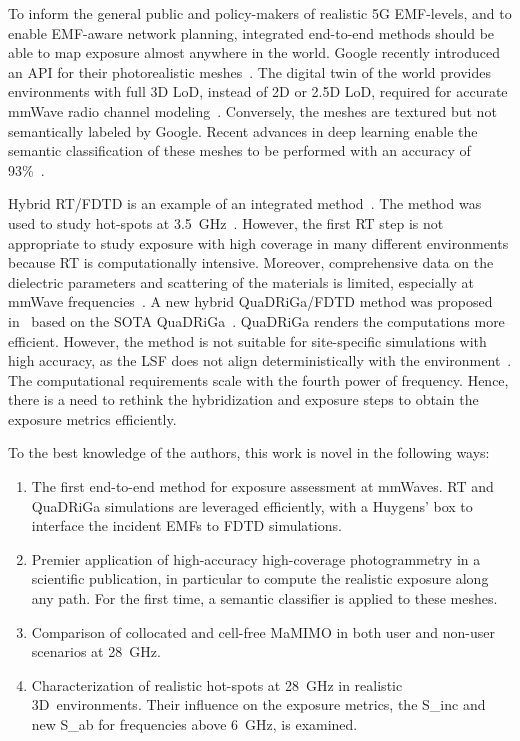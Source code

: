 \documentclass{IEEEtran}
\begin{document}
To inform the general public and policy-makers of realistic \gls{5G} \gls{EMF}-levels, and to enable \gls{EMF}-aware network planning, integrated end-to-end methods should be able to map exposure almost anywhere in the world. 
Google recently introduced an API for their photorealistic meshes~\cite{google}. The digital twin of the world provides environments with full 3D \gls{LoD}, instead of 2D or 2.5D \gls{LoD}, required for accurate \gls{mmWave} radio channel modeling~\cite{He, flatnotenough}. Conversely, the meshes are textured but not semantically labeled by Google. Recent advances in deep learning enable the semantic classification of these meshes to be performed with an accuracy of 93\%~\cite{SUMS}.

Hybrid \gls{RT}/\gls{FDTD} is an example of an integrated method~\cite{RT/FDTD1}. The method was used to study hot-spots at 3.5~GHz~\cite{hotspots_art}. However, the first \gls{RT} step is not appropriate to study exposure with high coverage in many different environments because \gls{RT} is computationally intensive. Moreover, comprehensive data on the dielectric parameters and scattering of the materials is limited, especially at \gls{mmWave} frequencies~\cite{EMparamishard}. A new hybrid \gls{QuaDRiGa}/\gls{FDTD} method was proposed in~\cite{QD/FDTD} based on the \gls{SOTA} \gls{QuaDRiGa}~\cite{Quadriga}. \gls{QuaDRiGa} renders the computations more efficient. However, the method is not suitable for site-specific simulations with high accuracy, as the \gls{LSF} does not align deterministically with the environment~\cite{hotspots_eucap}. The computational requirements scale with the fourth power of frequency. Hence, there is a need to rethink the hybridization and exposure steps to obtain the exposure metrics efficiently.

To the best knowledge of the authors, this work is novel in the following ways:
\begin{enumerate}
    \item The first end-to-end method for exposure assessment at \glspl{mmWave}. \Gls{RT} and \gls{QuaDRiGa} simulations are leveraged efficiently, with a Huygens' box to interface the incident \glspl{EMF} to \gls{FDTD} simulations.
    \item Premier application of high-accuracy high-coverage photogrammetry in a scientific publication, in particular to compute the realistic exposure along any path. For the first time, a semantic classifier is applied to these meshes.
    \item Comparison of collocated and cell-free \gls{MaMIMO} in both user and non-user scenarios at 28~GHz. 
    \item Characterization of realistic hot-spots at 28~GHz in realistic 3D~environments. Their influence on the exposure metrics, the \gls{S_inc} and new \gls{S_ab} for frequencies above 6~GHz, is examined. 
\end{enumerate} 
\end{document}
